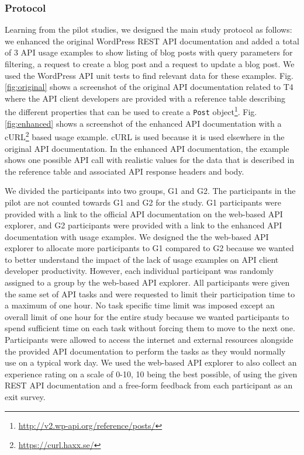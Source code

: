 \subsubsection{Protocol}
\label{sub:protocol}
Learning from the pilot studies, we designed the main study protocol as follows: we enhanced the original WordPress REST API documentation and added a total of 3 API usage examples to show listing of blog posts with query parameters for filtering, a request to create a blog post and a request to update a blog post. We used the WordPress API unit tests to find relevant data for these examples. Fig. \ref{fig:original} shows a screenshot of the original API documentation related to T4 where the API client developers are provided with a reference table describing the different properties that can be used to create a \lstinline{Post} object\footnote{\url{http://v2.wp-api.org/reference/posts/}}. Fig. \ref{fig:enhanced} shows a screenshot of the enhanced API documentation with a cURL\footnote{\url{https://curl.haxx.se/}} based usage example. cURL is used because it is used elsewhere in the original API documentation. In the enhanced API documentation, the example shows one possible API call with realistic values for the data that is described in the reference table and associated API response headers and body.

We divided the participants into two groups, G1 and G2. The participants in the pilot are not counted towards G1 and G2 for the study. G1 participants were provided with a link to the official API documentation on the web-based API explorer, and G2 participants were provided with a link to the enhanced API documentation with usage examples. We designed the the web-based API explorer to allocate more participants to G1 compared to G2 because we wanted to better understand the impact of the lack of usage examples on API client developer productivity. However, each individual participant was randomly assigned to a group by the web-based API explorer. All participants were given the same set of API tasks and were requested to limit their participation time to a maximum of one hour. No task specific time limit was imposed except an overall limit of one hour for the entire study because we wanted participants to spend sufficient time on each task without forcing them to move to the next one. Participants were allowed to access the internet and external resources alongside the provided API documentation to perform the tasks as they would normally use on a typical work day. We used the web-based API explorer to also collect an experience rating on a scale of 0-10, 10 being the best possible, of using the given REST API documentation and a free-form feedback from each participant as an exit survey.

